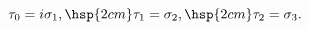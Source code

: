 \begin{equation}
\tau_0=i \sigma_1, \hsp{2cm}
\tau_1=\sigma_2, \hsp{2cm}
\tau_2=\sigma_3.
\end{equation}

